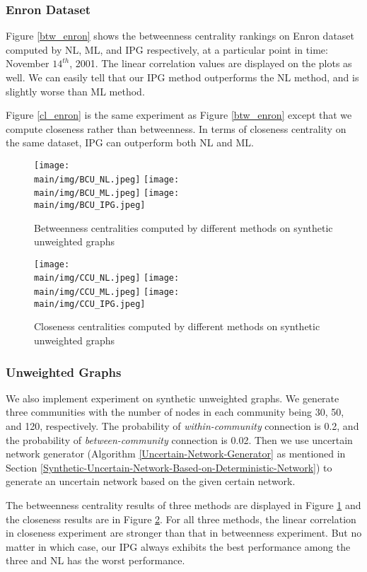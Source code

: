\documentclass[\main/thesis.tex]{subfiles}
\begin{document}
\subsubsection{Enron Dataset}
Figure \ref{btw_enron} shows the betweenness centrality rankings on Enron dataset computed by NL, ML, and IPG respectively, at a particular point in time: November $14^{th}$, 2001. The linear correlation values are displayed on the plots as well. We can easily tell that our IPG method outperforms the NL method, and is slightly worse than ML method.

Figure \ref{cl_enron} is the same experiment as Figure \ref{btw_enron} except that we compute closeness rather than betweenness. In terms of closeness centrality on the same dataset, IPG can outperform both NL and ML.

\begin{figure}
\texttt{[image: \\main/img/BCU\_NL.jpeg]}
\texttt{[image: \\main/img/BCU\_ML.jpeg]}
\centering
\texttt{[image: \\main/img/BCU\_IPG.jpeg]}
\caption{Betweenness centralities computed by different methods on synthetic unweighted graphs}
\label{btw_unweighted}
\end{figure}

\begin{figure}
\texttt{[image: \\main/img/CCU\_NL.jpeg]}
\texttt{[image: \\main/img/CCU\_ML.jpeg]}
\centering
\texttt{[image: \\main/img/CCU\_IPG.jpeg]}
\caption{Closeness centralities computed by different methods on synthetic unweighted graphs}
\label{cl_unweighted}
\end{figure}

\subsubsection{Unweighted Graphs} \label{Unweighted-Graphs-Experiment}
We also implement experiment on synthetic unweighted graphs. We generate three communities with the number of nodes in each community being 30, 50, and 120, respectively. The probability of \textit{within-community} connection is 0.2, and the probability of \textit{between-community} connection is 0.02. Then we use uncertain network generator (Algorithm \ref{Uncertain-Network-Generator} as mentioned in Section \ref{Synthetic-Uncertain-Network-Based-on-Deterministic-Network}) to generate an uncertain network based on the given certain network. 

The betweenness centrality results of three methods are displayed in Figure \ref{btw_unweighted} and the closeness results are in Figure \ref{cl_unweighted}. For all three methods, the linear correlation in closeness experiment are stronger than that in betweenness experiment. But no matter in which case, our IPG always exhibits the best performance among the three and NL has the worst performance.
\end{document}
